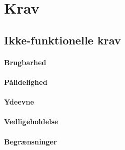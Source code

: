 \chapter{Krav}


\section*{Ikke-funktionelle krav}

\subsubsection*{Brugbarhed}

\subsubsection*{Pålidelighed}

\subsubsection*{Ydeevne}

\subsubsection*{Vedligeholdelse}

\subsubsection*{Begrænsninger}

